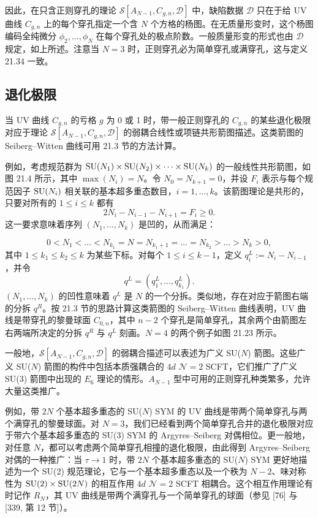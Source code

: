 因此，在只含正则穿孔的理论 $\mathcal{S}[A_{N-1},C_{g,n},\mathcal{D}]$ 中，缺陷数据 $\mathcal{D}$ 只在于给 UV 曲线 $C_{g,n}$ 上的每个穿孔指定一个含 $N$ 个方格的杨图。在无质量形变时，这个杨图编码全纯微分 $\phi_2,\dots,\phi_N$ 在每个穿孔处的极点阶数。一般质量形变的形式也由 $\mathcal{D}$ 规定，如上所述。注意当 $N=3$ 时，正则穿孔必为简单穿孔或满穿孔，这与定义 21.34 一致。

\subsection{退化极限}

当 UV 曲线 $C_{g,n}$ 的亏格 $g$ 为 0 或 1 时，带一般正则穿孔的 $C_{g,n}$ 的某些退化极限对应于理论 $\mathcal{S}[A_{N-1},C_{g,n},\mathcal{D}]$ 的弱耦合线性或项链共形箭图描述。这类箭图的 Seiberg–Witten 曲线可用 21.3 节的方法计算。

例如，考虑规范群为 $\operatorname{SU}(N_1)\times\operatorname{SU}(N_2)\times\dots\times\operatorname{SU}(N_k)$ 的一般线性共形箭图，如图 21.4 所示，其中 $\max(N_i)=N$。令 $N_0=N_{k+1}=0$，并设 $F_i$ 表示与每个规范因子 $\operatorname{SU}(N_i)$ 相关联的基本超多重态数目，$i=1,\dots,k$。该箭图理论是共形的，只要对所有的 $1\le i\le k$ 都有
\[
2N_i-N_{i-1}-N_{i+1}=F_i\ge0.
\]
这一要求意味着序列 $(N_1,\dots,N_k)$ 是凹的，从而满足：

\[
0<N_1<\dots<N_{k_1}=N=N_{k_1+1}=\dots=N_{k_2}>\dots>N_k>0,
\]
其中 $1\le k_1\le k_2\le k$ 为某些下标。对每个 $1\le i\le k-1$，定义 $q^L_i:=N_i-N_{i-1}$，并令
\[
q^L=(q^L_1,\dots,q^L_{k_1}).
\]
$(N_1,\dots,N_k)$ 的凹性意味着 $q^L$ 是 $N$ 的一个分拆。类似地，存在对应于箭图右端的分拆 $q^R$。按 21.3 节的思路计算这类箭图的 Seiberg–Witten 曲线表明，UV 曲线是带穿孔的黎曼球面 $C_{0,n}$，其中 $n-2$ 个穿孔是简单穿孔，其余两个由箭图左右两端所决定的分拆 $q^R$ 与 $q^L$ 刻画。$N=4$ 的两个例子如图 21.23 所示。


一般地，$\mathcal{S}[A_{N-1},C_{g,n},\mathcal{D}]$ 的弱耦合描述可以表述为广义 SU($N$) 箭图。这些广义 SU($N$) 箭图的构件中包括本质强耦合的 $4d$ $\mathcal{N}=2$ SCFT，它们推广了广义 SU(3) 箭图中出现的 $E_6$ 理论的情形。$A_{N-1}$ 型中可用的正则穿孔种类繁多，允许大量这类推广。

例如，带 $2N$ 个基本超多重态的 SU($N$) SYM 的 UV 曲线是带两个简单穿孔与两个满穿孔的黎曼球面。对 $N=3$，我们已经看到两个简单穿孔合并的退化极限对应于带六个基本超多重态的 SU(3) SYM 的 Argyres–Seiberg 对偶相位。更一般地，对任意 $N$，都可以考虑两个简单穿孔相撞的退化极限，由此得到 Argyres–Seiberg 对偶的一种推广：当 $\tau\to1$ 时，带 $2N$ 个基本超多重态的 SU($N$) SYM 更好地描述为一个 SU(2) 规范理论，它与一个基本超多重态以及一个秩为 $N-2$、味对称性为 $\operatorname{SU}(2)\times\operatorname{SU}(2N)$ 的相互作用 $4d$ $\mathcal{N}=2$ SCFT 相耦合。这个相互作用理论有时记作
$R_N$，其 UV 曲线是带两个满穿孔与一个简单穿孔的球面（参见 [76] 与 [339, 第 12 节]）。

